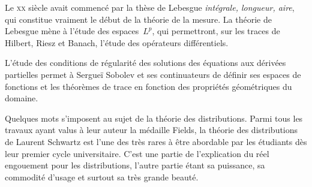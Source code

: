 \medskip
\begin{histoire}%
\ifVersionDuDocEstVincent{}\selectfont\fi
Le \textsc{xx} siècle avait commencé par la thèse de Lebesgue \emph{intégrale, longueur, aire}, qui constitue vraiment le début de la théorie de la mesure.
La théorie de Lebesgue mène à l'étude des espaces~$L^p$, qui permettront, sur les traces de Hilbert, Riesz et Banach, l'étude des opérateurs différentiels.

\medskip
{}

\medskip
L'étude des conditions de régularité des solutions des équations aux dérivées partielles permet à Sergueï Sobolev et ses continuateurs de définir ses espaces de fonctions et les théorèmes de trace en fonction des propriétés géométriques du domaine.

\medskip
Quelques mots s'imposent au sujet de la théorie des distributions.
Parmi tous les travaux ayant valus à leur auteur la médaille Fields, la théorie des distributions de Laurent Schwartz est l'une des très rares à être abordable par les étudiants dès leur premier cycle universitaire. C'est une partie de l'explication du réel engouement pour les distributions, l'autre partie étant sa puissance, sa commodité d'usage et surtout sa très grande beauté.


\end{histoire}
